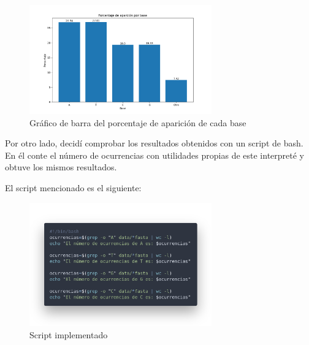 \begin{figure}[H]
    \centering
    \includegraphics[width=0.70\textwidth]{Images/fig2.png}   
    \caption{Gráfico de barra del porcentaje de aparición de cada base}
    \label{fig:grafica2ej4}
\end{figure}

Por otro lado, decidí comprobar los resultados obtenidos con un script de bash. En él conte el número de ocurrencias con utilidades propias de este interpreté y obtuve los mismos resultados.

El script mencionado es el siguiente:




\begin{figure}[H]
    \centering
    \includegraphics[width=0.70\textwidth]{Images/ej4/script.png}
    \caption{Script implementado}
    \label{fig:scriptej4}
\end{figure}

